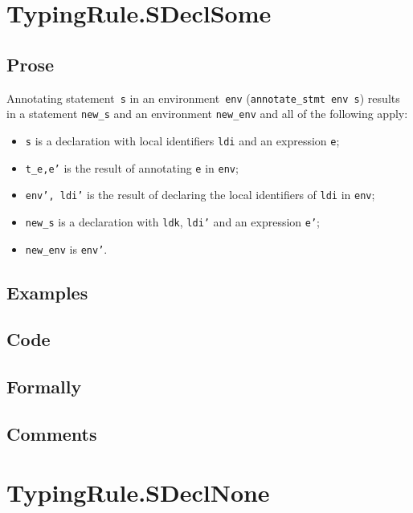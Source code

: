 \documentclass{book}
\begin{document}
\section{TypingRule.SDeclSome \label{sec:TypingRule.SDeclSome}}

  \subsection{Prose}
Annotating statement~\texttt{s} in an environment~\texttt{env}
(\texttt{annotate\_stmt env s}) results in a statement \texttt{new\_s} and an
environment \texttt{new\_env} and all of the following apply:
   \begin{itemize}
   \item \texttt{s} is a declaration with local identifiers \texttt{ldi} and an expression \texttt{e};
   \item \texttt{t\_e,e'} is the result of annotating \texttt{e} in \texttt{env};
   \item \texttt{env', ldi'} is the result of declaring the local identifiers of \texttt{ldi} in \texttt{env};
   \item \texttt{new\_s} is a declaration with \texttt{ldk}, \texttt{ldi'} and an expression \texttt{e'};
   \item \texttt{new\_env} is \texttt{env'}.
   \end{itemize}

  \subsection{Examples}

  \subsection{Code}

  \subsection{Formally}

  \subsection{Comments}

\section{TypingRule.SDeclNone \label{sec:TypingRule.SDeclNone}}
\end{document}
